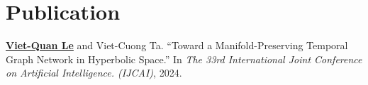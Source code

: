 \chapter*{Publication}

\begin{enumerate}[label={[Pub \arabic*]},leftmargin=3cm]

\item \underline{\textbf{Viet-Quan Le}} and Viet-Cuong Ta. ``Toward a Manifold-Preserving Temporal Graph Network in Hyperbolic Space.'' In \textit{The 33rd International Joint Conference on Artificial Intelligence. (IJCAI)}, 2024.

\end{enumerate}